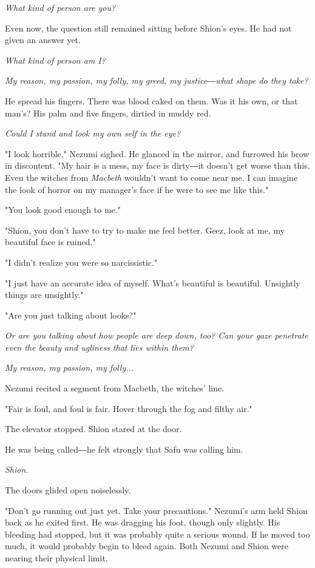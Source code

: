 \emph{What kind of person are you?}

Even now, the question still remained sitting before Shion's eyes. He
had not given an answer yet.

\emph{What kind of person am I?}

\emph{My reason, my passion, my folly, my greed, my justice―what shape do they
take?}

He spread his fingers. There was blood caked on them. Was it his own, or
that man's? His palm and five fingers, dirtied in muddy red.

\emph{Could I stand and look my own self in the eye?}

"I look horrible," Nezumi sighed. He glanced in the mirror, and furrowed
his brow in discontent. "My hair is a mess, my face is dirty―it doesn't
get worse than this. Even the witches from \emph{Macbeth} wouldn't want to come
near me. I can imagine the look of horror on my manager's face if he
were to see me like this."

"You look good enough to me."

"Shion, you don't have to try to make me feel better. Geez, look at me,
my beautiful face is ruined."

"I didn't realize you were so narcissistic."

"I just have an accurate idea of myself. What's beautiful is beautiful.
Unsightly things are unsightly."

"Are you just talking about looks?"

\emph{Or are you talking about how people are deep down, too? Can your gaze
penetrate even the beauty and ugliness that lies within them?}

\emph{My reason, my passion, my folly...}

Nezumi recited a segment from Macbeth, the witches' line.

"Fair is foul, and foul is fair. Hover through the fog and filthy air."

The elevator stopped. Shion stared at the door.

He was being called―he felt strongly that Safu was calling him.

\emph{Shion.}

The doors glided open noiselessly.

"Don't go running out just yet. Take your precautions." Nezumi's arm
held Shion back as he exited first. He was dragging his foot, though
only slightly. His bleeding had stopped, but it was probably quite a
serious wound. If he moved too much, it would probably begin to bleed
again. Both Nezumi and Shion were nearing their physical limit.

